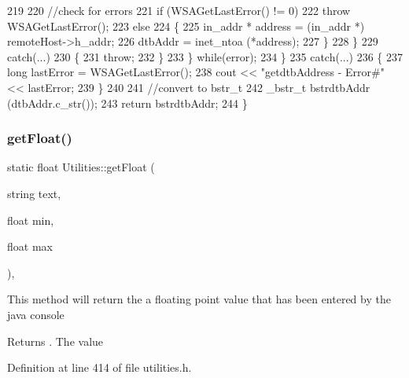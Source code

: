 \begin{DoxyCode}
219 
220                     \textcolor{comment}{//check for errors}
221                     \textcolor{keywordflow}{if} (WSAGetLastError() != 0) 
222                         \textcolor{keywordflow}{throw} WSAGetLastError();
223                     \textcolor{keywordflow}{else}
224                     \{
225                         in\_addr * address = (in\_addr *) remoteHost->h\_addr;
226                         dtbAddr = inet\_ntoa (*address);
227                     \}
228                 \}
229                 \textcolor{keywordflow}{catch}(...)
230                 \{
231                     \textcolor{keywordflow}{throw};
232                 \}
233             \} \textcolor{keywordflow}{while}(error);
234         \}
235         \textcolor{keywordflow}{catch}(...)
236         \{
237             \textcolor{keywordtype}{long} lastError = WSAGetLastError();
238             cout << \textcolor{stringliteral}{"getdtbAddress - Error#"} << lastError;
239         \}
240 
241         \textcolor{comment}{//convert to bstr\_t}
242         \_bstr\_t bstrdtbAddr (dtbAddr.c\_str());
243         \textcolor{keywordflow}{return} bstrdtbAddr;
244     \}
\end{DoxyCode}
\mbox{\label{class_utilities_a7c3601cdf332005fbf77b4d1676945ec_a7c3601cdf332005fbf77b4d1676945ec}} 
\subsubsection{\texorpdfstring{get\+Float()}{getFloat()}}
{\footnotesize\ttfamily static float Utilities\+::get\+Float (\begin{DoxyParamCaption}\item[{string}]{text,  }\item[{float}]{min,  }\item[{float}]{max }\end{DoxyParamCaption})\hspace{0.3cm}{\ttfamily [inline]}, {\ttfamily [static]}}

This method will return the a floating point value that has been entered by the java console \begin{DoxyReturn}{Returns}
. The value 
\end{DoxyReturn}


Definition at line 414 of file utilities.\+h.


